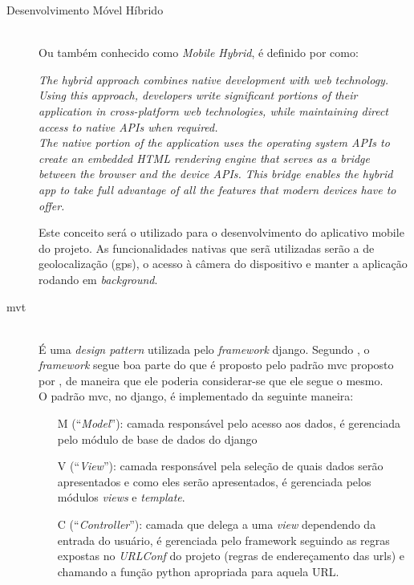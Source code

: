 \begin{description}
%
    \item[Desenvolvimento Móvel Híbrido] \hfill \\
        Ou também conhecido como \textit{Mobile Hybrid}, é definido por  como:
        \begin{citacao}
            \textit{The hybrid approach combines native development with web technology. Using this approach, developers write significant portions of their application in cross-platform web technologies, while maintaining direct access to native APIs when required.}\\
        \textit{The native portion of the application uses the operating system APIs to create an embedded HTML rendering engine that serves as a bridge between the browser and the device APIs. This bridge enables the hybrid app to take full advantage of all the features that modern devices have to offer.}
        \end{citacao}
        Este conceito será o utilizado para o desenvolvimento do aplicativo mobile do projeto. As funcionalidades nativas que serã utilizadas serão a de geolocalização (gps), o acesso à câmera do dispositivo e manter a aplicação rodando em \textit{background}.%
\clearpage
    \item[\gls{mvt}] \hfill \\
        É uma \textit{design pattern} utilizada pelo \textit{framework} \gls{django}. Segundo , o \textit{framework} segue boa parte do que é proposto pelo padrão \gls{mvc} proposto por , de maneira que ele poderia considerar-se que ele segue o mesmo.\\
        O padrão \gls{mvc}, no \gls{django}, é implementado da seguinte maneira:
        \begin{itemize}
	        \item[M](``\textit{Model}''): camada responsável pelo acesso aos dados, é gerenciada pelo módulo de base de dados do \gls{django}
	        \item[V](``\textit{View}''): camada responsável pela seleção de quais dados serão apresentados e como eles serão apresentados, é gerenciada pelos módulos \textit{views} e \textit{template}.
	        \item[C](``\textit{Controller}''): camada que delega a uma \textit{view} dependendo da entrada do usuário, é gerenciada pelo framework seguindo as regras expostas no \textit{URLConf} do projeto (regras de endereçamento das urls) e chamando a função python apropriada para aquela URL.

\end{itemize}
\end{description}
